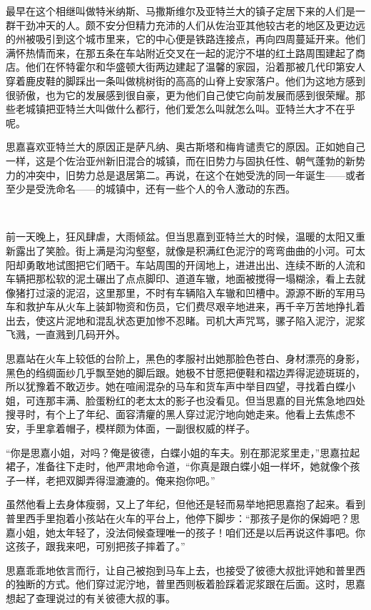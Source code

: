 \par 最早在这个相继叫做特米纳斯、马撒斯维尔及亚特兰大的镇子定居下来的人们是一群干劲冲天的人。颇不安分但精力充沛的人们从佐治亚其他较古老的地区及更边远的州被吸引到这个城市里来，它的中心便是铁路连接点，再向四周蔓延开来。他们满怀热情而来，在那五条在车站附近交叉在一起的泥泞不堪的红土路周围建起了商店。他们在怀特霍尔和华盛顿大街两边建起了温馨的家园，沿着那被几代印第安人穿着鹿皮鞋的脚踩出一条叫做桃树街的高高的山脊上安家落户。他们为这地方感到很骄傲，也为它的发展感到很自豪，更为他们自己使它向前发展而感到很荣耀。那些老城镇把亚特兰大叫做什么都行，他们爱怎么叫就怎么叫。亚特兰大才不在乎呢。
\par 思嘉喜欢亚特兰大的原因正是萨凡纳、奥古斯塔和梅肯谴责它的原因。正如她自己一样，这是个佐治亚州新旧混合的城镇，而在旧势力与固执任性、朝气蓬勃的新势力的冲突中，旧势力总是退居第二。再说，在这个在她受洗的同一年诞生——或者至少是受洗命名——的城镇中，还有一些个人的令人激动的东西。
\par  
\par 前一天晚上，狂风肆虐，大雨倾盆。但当思嘉到亚特兰大的时候，温暖的太阳又重新露出了笑脸。街上满是沟沟壑壑，就像是积满红色泥泞的弯弯曲曲的小河。可太阳却勇敢地试图把它们晒干。车站周围的开阔地上，进进出出、连续不断的人流和车辆把那松软的泥土碾出了点点脚印、道道车辙，地面被搅得一塌糊涂，看上去就像猪打过滚的泥沼，这里那里，不时有车辆陷入车辙和凹槽中。源源不断的军用马车和救护车从火车上装卸物资和伤员，它们费尽艰辛地进来，再千辛万苦地挣扎着出去，使这片泥地和混乱状态更加惨不忍睹。司机大声咒骂，骡子陷入泥泞，泥浆飞溅，一直溅到几码开外。
\par 思嘉站在火车上较低的台阶上，黑色的孝服衬出她那脸色苍白、身材漂亮的身影，黑色的绉绸面纱几乎飘至她的脚后跟。她极不甘愿把便鞋和褶边弄得泥迹斑斑的，所以犹豫着不敢迈步。她在喧闹混杂的马车和货车声中举目四望，寻找着白蝶小姐，可连那丰满、脸蛋粉红的老太太的影子也没看见。但当思嘉的目光焦急地四处搜寻时，有个上了年纪、面容清癯的黑人穿过泥泞地向她走来。他看上去焦虑不安，手里拿着帽子，模样颇为体面，一副很权威的样子。
\par “你是思嘉小姐，对吗？俺是彼德，白蝶小姐的车夫。别在那泥浆里走，”思嘉拉起裙子，准备往下走时，他严肃地命令道，“你真是跟白蝶小姐一样坏，她就像个孩子一样，老把双脚弄得湿漉漉的。俺来抱你吧。”
\par 虽然他看上去身体瘦弱，又上了年纪，但他还是轻而易举地把思嘉抱了起来。看到普里西手里抱着小孩站在火车的平台上，他停下脚步：“那孩子是你的保姆吧？思嘉小姐，她太年轻了，没法伺候查理唯一的孩子！咱们还是以后再说这件事吧。你这孩子，跟我来吧，可别把孩子摔着了。”
\par 思嘉乖乖地依言而行，让自己被抱到马车上去，也接受了彼德大叔批评她和普里西的独断的方式。他们穿过泥泞地，普里西则板着脸踩着泥浆跟在后面。这时，思嘉想起了查理说过的有关彼德大叔的事。
